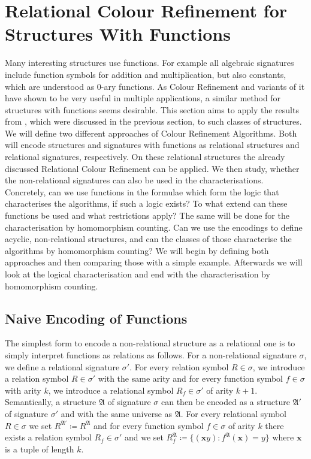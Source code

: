 \section{Relational Colour Refinement for Structures With Functions}
\label{sec:RelationalColourRefinemetForStructuresWithFunctions}

Many interesting structures use functions.
For example all algebraic signatures include function symbols for addition and multiplication, but also constants, which are understood as $0$-ary functions.
As Colour Refinement and variants of it have shown to be very useful in multiple applications, a similar method for structures with functions seems desirable.
This section aims to apply the results from \cite{scheidt2025ColorRefinement}, which were discussed in the previous section, to such classes of structures.
We will define two different approaches of Colour Refinement Algorithms.
Both will encode structures and signatures with functions as relational structures and relational signatures, respectively.
On these relational structures the already discussed Relational Colour Refinement can be applied.
We then study, whether the non-relational signatures can also be used in the characterisations.
Concretely, can we use functions in the formulae which form the logic that characterises the algorithms, if such a logic exists?
To what extend can these functions be used and what restrictions apply?
The same will be done for the characterisation by homomorphism counting.
Can we use the encodings to define acyclic, non-relational structures, and can the classes of those characterise the algorithms by homomorphism counting?
We will begin by defining both approaches and then comparing those with a simple example.
Afterwards we will look at the logical characterisation and end with the characterisation by homomorphism counting.


\subsection{Naive Encoding of Functions}
\label{sec::NaiveEncodingOfFunctions}

The simplest form to encode a non-relational structure as a relational one is to simply interpret functions as relations as follows.
For a non-relational signature $\sigma$, we define a relational signature $\sigma'$.
For every relation symbol $R\in \sigma$, we introduce a relation symbol $R\in \sigma'$ with the same arity and for every function symbol $f\in\sigma$ with arity $k$, we introduce a relational symbol $R_f\in\sigma'$ of arity $k+1$.
Semantically, a structure $\mathfrak A$ of signature $\sigma$ can then be encoded as a structure $\mathfrak A'$ of signature $\sigma'$ and with the same universe as $\mathfrak A$. 
For every relational symbol $R\in\sigma$ we set $R^{\mathfrak A'}\coloneqq R^{\mathfrak A}$ and for every function symbol $f\in\sigma$ of arity $k$ there exists a relation symbol $R_f\in\sigma'$ and we set $R_f^{\mathfrak A}\coloneqq \{(\mathbf xy) : f^{\mathfrak A}(\mathbf x)=y\}$ where $\mathbf x$ is a tuple of length $k$.

